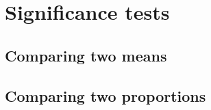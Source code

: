 %
%
%
\section{Significance tests}

	\subsection{Comparing two means}

	\subsection{Comparing two proportions}

